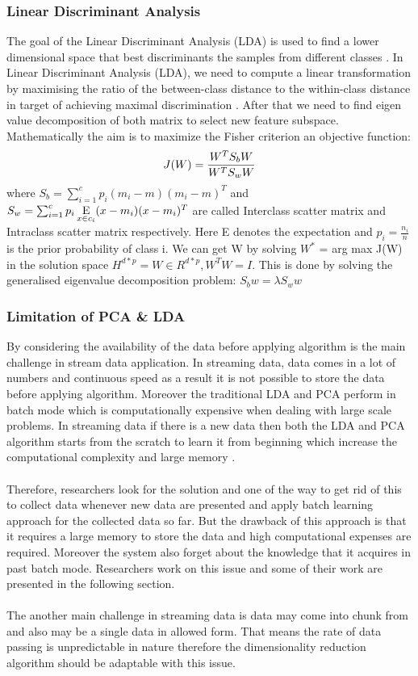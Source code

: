 \subsubsection{Linear Discriminant Analysis}
The goal of the Linear Discriminant Analysis (LDA) is used to find a lower dimensional space that best discriminants the samples from different classes \cite{thesis1}. In Linear Discriminant Analysis (LDA), we need to compute a linear transformation by maximising the ratio of the between-class distance to the within-class distance in target of achieving maximal discrimination \cite{p313}. After that we need to find eigen value decomposition of both matrix to select new feature subspace.
Mathematically the aim is to maximize the Fisher criterion an objective function: 
\begin{equation}
\textit{$ J(W) = \frac{W^TS_{b}W}{W^TS_{w}W} $} 
\end{equation}
where $S_{b} = \sum_{i=1}^{c}p_i(m_{i}-m) (m_{i}-m)^T$ and $S_w = \sum_{i=1}^{c}p_i \operatornamewithlimits{E}\limits_{x\in c_{i}} (x-m_{i})(x-m_{i})^{T}$ are called Interclass scatter matrix and Intraclass scatter matrix respectively. Here E denotes the expectation and $p_i = \frac{n_{i}}{n}$ is the prior probability of class i. We can get W by solving $W^{*}$ = arg max J(W) in the solution space $H^{d*p} = {W \in R^{d*p}, W^{T}W = I}$. This is done by solving the generalised eigenvalue decomposition problem: \textit{$S_{b}w = \lambda S_{w}w$}
\subsubsection{Limitation of PCA \& LDA}
By considering the availability of the data before applying algorithm is the main challenge in stream data application. In streaming data, data comes in a lot of numbers and continuous speed as a result it is not possible to store the data before applying algorithm. Moreover the traditional LDA and PCA perform in batch mode which is computationally expensive when dealing with large scale problems. In streaming data if there is a new data then both the LDA and PCA algorithm starts from the scratch to learn it from beginning which increase the computational complexity and large memory \cite{p316}.\\\\
Therefore, researchers look for the solution and one of the way to get rid of this to collect data whenever new data are presented and apply batch learning approach for the collected data so far. But the drawback of this approach is that it requires a large memory to store the data and high computational expenses are required. Moreover the system also forget about the knowledge that it acquires in past batch mode. Researchers work on this issue and some of their work are presented in the following section.\\\\
The another main challenge in streaming data is data may come into chunk from and also may be a single data in allowed form. That means the rate of data passing is unpredictable in nature therefore the dimensionality reduction algorithm should be adaptable with this issue.
